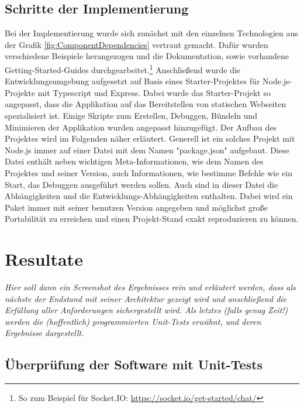 \subsection{Schritte der Implementierung}
\label{subsec:Implementierung}
Bei der Implementierung wurde sich zunächst mit den einzelnen Technologien aus der Grafik \ref{fig:ComponentDependencies} vertraut gemacht. Dafür wurden verschiedene Beispiele herangezogen und die Dokumentation, sowie \ggf vorhandene Getting-Started-Guides durchgearbeitet.\footnote{So zum Beispiel für Socket.IO: \url{https://socket.io/get-started/chat/}}
Anschließend wurde die Entwicklungsumgebung aufgesetzt auf Basis eines Starter-Projektes für Node.js-Projekte mit Typescript und Express.\cite{typescript_node_starter} Dabei wurde das Starter-Projekt so angepasst, dass die Applikation auf das Bereitstellen von statischen Webseiten spezialisiert ist. Einige Skripte zum Erstellen, Debuggen, Bündeln und Minimieren der Applikation wurden angepasst \bzw hinzugefügt. Der Aufbau des Projektes wird im Folgenden näher erläutert.
Generell ist ein solches Projekt mit Node.js immer auf einer Datei mit dem Namen "package.json" aufgebaut. Diese Datei enthält neben wichtigen Meta-Informationen, wie dem Namen des Projektes und seiner Version, auch Informationen, wie bestimme Befehle wie ein Start, das Debuggen \etc ausgeführt werden sollen. Auch sind in dieser Datei die Abhängigkeiten und die Entwicklungs-Abhängigkeiten enthalten. Dabei wird ein Paket immer mit seiner benutzen Version angegeben und möglichst große Portabilität zu erreichen und einen Projekt-Stand exakt reproduzieren zu können.

\section{Resultate}
\label{sec:Resultate}

\emph{Hier soll dann ein Screenshot des Ergebnisses rein und erläutert werden, dass als nächste der Endstand mit seiner Architektur gezeigt wird und anschließend die Erfüllung aller Anforderungen sichergestellt wird. Als letztes (falls genug Zeit!) werden die (hoffentlich) programmierten Unit-Tests erwähnt, und deren Ergebnisse dargestellt.}

\subsection{Überprüfung der Software mit Unit-Tests}
\label{subsec:unittests}

